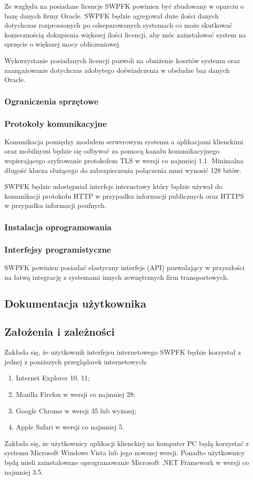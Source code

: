 Ze względu na posiadane licencje SWPFK powinien być zbudowany w oparciu o bazę danych firmy Oracle. SWPFK będzie agregował duże ilości danych dotychczas rozproszonych po odseparowanych systemach co może skutkować koniecznością dokupienia większej ilości licencji, aby móc zainstalować system na sprzęcie o większej mocy obliczeniowej.

Wykorzystanie posiadanych licencji pozwoli na obniżenie kosztów systemu oraz zaangażowanie dotychczas zdobytego doświadczenia w obsłudze baz danych Oracle.

\subsubsection{Ograniczenia sprzętowe}

\subsubsection{Protokoły komunikacyjne}
Komunikacja pomiędzy modułem serwerowym systemu a aplikacjami klienckimi oraz mobilnymi będzie się odbywać za pomocą kanału komunikacyjnego wspierającego szyfrowanie protokołem TLS w wersji co najmniej 1.1. Minimalna długość klucza służącego do zabezpieczenia połączenia musi wynosić 128 bitów.

SWPFK będzie udostępniał interfejs internetowy który będzie używał do komunikacji protokołu HTTP w przypadku informacji publicznych oraz HTTPS w przypadku informacji poufnych.

\subsubsection{Instalacja oprogramowania}

\subsubsection{Interfejsy programistyczne}
SWPFK powinien posiadać elastyczny interfejs (API) pozwalający w przyszłości na łatwą integrację z systemami innych zewnętrznych firm transportowych.

\subsection{Dokumentacja użytkownika}

\subsection{Założenia i zależności}
Zakłada się, że użytkownik interfejsu internetowego SWPFK będzie korzystał z jednej z poniższych przeglądarek internetowych:
\begin{enumerate}
\item Internet Explorer 10, 11;
\item Mozilla Firefox w wersji co najmniej 28;
\item Google Chrome w wersji 35 lub wyższej;
\item Apple Safari w wersji co najmniej 5.
\end{enumerate}

Zakłada się, że użytkownicy aplikacji klienckiej na komputer PC będą korzystać z systemu Microsoft Windows Vista lub jego nowszej wersji. Ponadto użytkownicy będą mieli zainstalowane oprogramowanie Microsoft .NET Framework w wersji co najmniej 3.5.